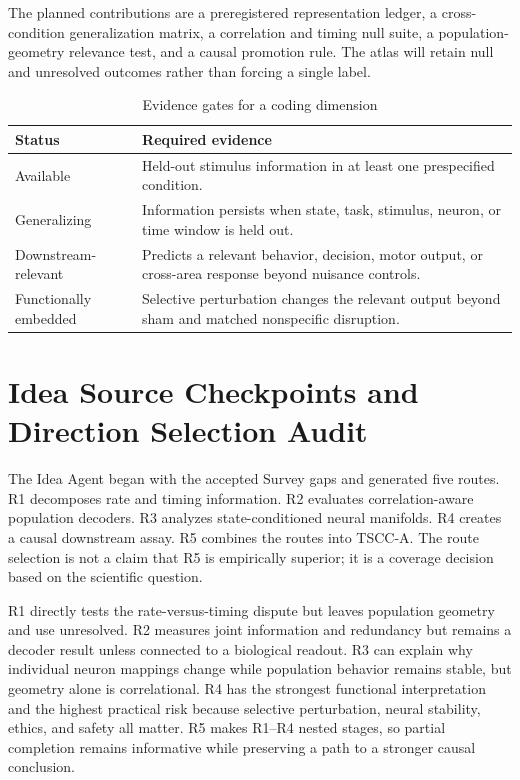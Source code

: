 \documentclass[conference]{IEEEtran}
\begin{document}
The planned contributions are a preregistered representation ledger, a cross-condition generalization matrix, a correlation and timing null suite, a population-geometry relevance test, and a causal promotion rule. The atlas will retain null and unresolved outcomes rather than forcing a single label.

\begin{table}[t]
\caption{Evidence gates for a coding dimension}
\label{tab:gates}
\centering
\footnotesize
\begin{tabular}{p{}p{}}
\toprule
Status & Required evidence \\
\midrule
Available & Held-out stimulus information in at least one prespecified condition. \\
Generalizing & Information persists when state, task, stimulus, neuron, or time window is held out. \\
Downstream-relevant & Predicts a relevant behavior, decision, motor output, or cross-area response beyond nuisance controls. \\
Functionally embedded & Selective perturbation changes the relevant output beyond sham and matched nonspecific disruption. \\
\bottomrule
\end{tabular}
\end{table}

\section{Idea Source Checkpoints and Direction Selection Audit}
The Idea Agent began with the accepted Survey gaps and generated five routes. R1 decomposes rate and timing information. R2 evaluates correlation-aware population decoders. R3 analyzes state-conditioned neural manifolds. R4 creates a causal downstream assay. R5 combines the routes into TSCC-A. The route selection is not a claim that R5 is empirically superior; it is a coverage decision based on the scientific question.

R1 directly tests the rate-versus-timing dispute but leaves population geometry and use unresolved. R2 measures joint information and redundancy but remains a decoder result unless connected to a biological readout. R3 can explain why individual neuron mappings change while population behavior remains stable, but geometry alone is correlational. R4 has the strongest functional interpretation and the highest practical risk because selective perturbation, neural stability, ethics, and safety all matter. R5 makes R1--R4 nested stages, so partial completion remains informative while preserving a path to a stronger causal conclusion.
\end{document}
